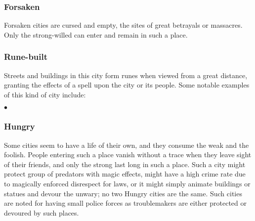\subsubsection{Forsaken}

Forsaken cities are cursed and empty, the sites of great betrayals or massacres. Only the strong-willed can enter and remain in such a place.



\subsubsection{Rune-built}

Streets and buildings in this city form runes when viewed from a great distance, granting the effects of a spell upon the city or its people. Some notable examples of this kind of city include:

\begin{list}{$\bullet$}{\itemspace}
\end{list}



\subsubsection{Hungry}

Some cities seem to have a life of their own, and they consume the weak and the foolish. People entering such a place vanish without a trace when they leave sight of their friends, and only the strong last long in such a place. Such a city might protect group of predators with magic effects, might have a high crime rate due to magically enforced disrespect for laws, or it might simply animate buildings or statues and devour the unwary; no two Hungry cities are the same. Such cities are noted for having small police forces as troublemakers are either protected or devoured by such places.

